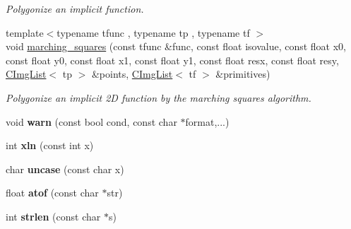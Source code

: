 \begin{DoxyCompactItemize}
\begin{DoxyCompactList}\small\item\em Polygonize an implicit function. \item\end{DoxyCompactList}\item 
\hypertarget{namespacecimg__library_1_1cimg_a4b717b5f772d40d4026e42a0b943124d}{
{\footnotesize template$<$typename tfunc , typename tp , typename tf $>$ }\\void \hyperlink{namespacecimg__library_1_1cimg_a4b717b5f772d40d4026e42a0b943124d}{marching\_\-squares} (const tfunc \&func, const float isovalue, const float x0, const float y0, const float x1, const float y1, const float resx, const float resy, \hyperlink{structcimg__library_1_1_c_img_list}{CImgList}$<$ tp $>$ \&points, \hyperlink{structcimg__library_1_1_c_img_list}{CImgList}$<$ tf $>$ \&primitives)}
\label{namespacecimg__library_1_1cimg_a4b717b5f772d40d4026e42a0b943124d}

\begin{DoxyCompactList}\small\item\em Polygonize an implicit 2D function by the marching squares algorithm. \item\end{DoxyCompactList}\item 
\hypertarget{namespacecimg__library_1_1cimg_a844f71dfe3c65338716a564f18550d98}{
void {\bfseries warn} (const bool cond, const char $\ast$format,...)}
\label{namespacecimg__library_1_1cimg_a844f71dfe3c65338716a564f18550d98}

\item 
\hypertarget{namespacecimg__library_1_1cimg_a8dde183be46c1821a3901b63825a4cf4}{
int {\bfseries xln} (const int x)}
\label{namespacecimg__library_1_1cimg_a8dde183be46c1821a3901b63825a4cf4}

\item 
\hypertarget{namespacecimg__library_1_1cimg_a5a028d4d4de4e1894263a29a6de8e2ee}{
char {\bfseries uncase} (const char x)}
\label{namespacecimg__library_1_1cimg_a5a028d4d4de4e1894263a29a6de8e2ee}

\item 
\hypertarget{namespacecimg__library_1_1cimg_a9351fb264b6bffb8d45141777a8099b5}{
float {\bfseries atof} (const char $\ast$str)}
\label{namespacecimg__library_1_1cimg_a9351fb264b6bffb8d45141777a8099b5}

\item 
\hypertarget{namespacecimg__library_1_1cimg_ad98b32d24a175c3d81024247660964b4}{
int {\bfseries strlen} (const char $\ast$s)}
\label{namespacecimg__library_1_1cimg_ad98b32d24a175c3d81024247660964b4}


\end{DoxyCompactItemize}
